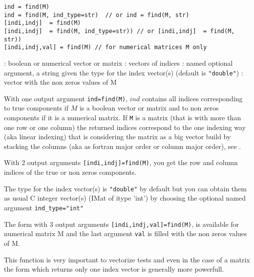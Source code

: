 
\begin{mandesc}
\end{mandesc}

\begin{calling_sequence}
\begin{verbatim}
ind = find(M)
ind = find(M, ind_type=str)  // or ind = find(M, str)
[indi,indj]  = find(M)
[indi,indj]  = find(M, ind_type=str)) // or [indi,indj]  = find(M, str))
[indi,indj,val] = find(M) // for numerical matrices M only
\end{verbatim}
\end{calling_sequence}
\begin{parameters}
  \begin{varlist}
    :  boolean or  numerical vector or matrix
    : vectors of indices
    : named optional argument, a string given the type for the index vector(s) (default is \verb+"double"+)
    : vector with the non zeros values of M
  \end{varlist}
\end{parameters}

\begin{mandescription}
With one output argument \verb+ind=find(M)+,  $ind$ contains all indices 
corresponding to true components if $M$ is a boolean vector or matrix 
and to non zeros components if it is a numerical matrix. If \verb+M+
is a matrix (that is with more than one row or one
column) the returned indices correspond to the one indexing way (aka
linear indexing)
that is considering the matrix as a big vector build by stacking 
the columns (aka as fortran major order or column major order),
see .

With 2 output arguments \verb+[indi,indj]=find(M)+,
you get the  row and column indices of the true or non zeros components.

The type for the index vector(s) is \verb+"double"+ by default but you
can obtain them as usual C integer vector(s) (IMat of itype 'int') 
by choosing the optional named argument \verb+ind_type="int"+

The form with 3 output arguments \verb+[indi,indj,val]=find(M)+, is available
for numerical matrix M and the last argument \verb+val+ is filled with
the non zeros values of M.


This function is very important to vectorize tests and even in the 
case of a matrix the form which returns only one 
index vector is generally more powerfull.
\end{mandescription}

